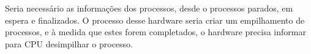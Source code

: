 \begin{question}

    Seria necessário as informações dos processos, desde o 
    processos parados, em espera e finalizados. O processo desse hardware 
    seria criar um empilhamento de processos, e à medida que estes 
    forem completados, o hardware precisa informar para CPU desimpilhar o processo.

\end{question}

